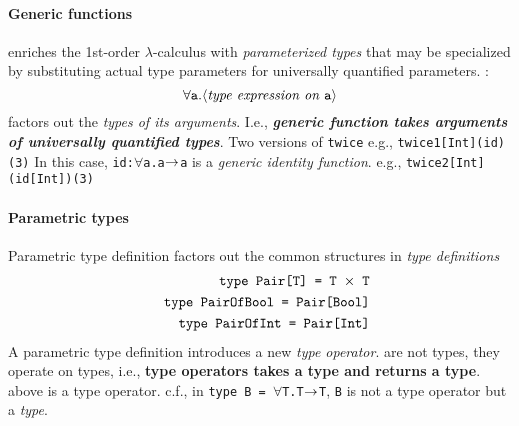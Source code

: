 \documentclass{article}
\begin{document}
\paragraph{Generic functions}
\bit
{} enriches the 1st-order $\lambda$-calculus
	with {\em{}parameterized types\/} that may be specialized by
	substituting actual type parameters for universally quantified
	parameters.
: 
	\[ \forall{\mbox{\tt{}a}}.\mbox{$\langle{\textit{\mbox{\rm\em{}type expression 
		on {\tt{}a}}}}\rangle$}\]
 factors out the {\em{}types of its arguments\/}.
	\bit
	\w I.e., {\sl\bfseries{}generic function takes arguments of 
		universally quantified 
		types\/}.
	\eit
\w Two versions of {\tt{}twice}
	\bit
		\bit
		\w e.g., {\tt{}twice1[Int](id)(3)}
		\w In this case, {\tt{}id:$\forall$a.a$\mbox{$\rightarrow$}$a} is a 
			{\em{}generic identity function}.
		\eit
		\bit
		\w e.g., {\tt{}twice2[Int](id[Int])(3)}
		\eit
	\eit
\eit

\paragraph{Parametric types}
\bit
\w Parametric type definition factors out the common structures in 
	{\em{}type definitions}
	\begin{eqnarray*}
	&&\mbox{\tt{}type Pair[T] = T $\times$ T}\\
	&&\mbox{\tt{}type PairOfBool = Pair[Bool]}\\
	&&\mbox{\tt{}type PairOfInt = Pair[Int]}
	\end{eqnarray*}
\w A parametric type definition introduces a new {\em{}type operator}.
	\bit
	 are not types, they operate on types, i.e.,
		{\bf{}type operators takes a type and returns a type}.
	 above is a type operator.
	\w c.f., in {\tt{}type B = $\forall$T.T$\mbox{$\rightarrow$}$T}, 
		{\tt{}B} is not a type operator but a {\em{}type}.
	\eit
\eit
\end{document}
